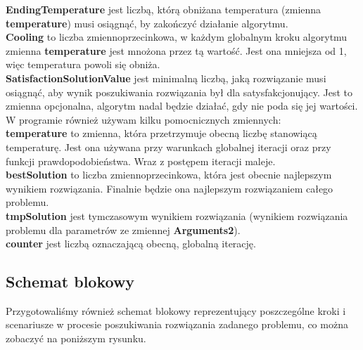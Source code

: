 \documentclass[twoside]{projektInzynierskiMS1}
\newcommand{\si}{ś}
\begin{document}
\textbf{EndingTemperature} jest liczbą, którą obniżana temperatura (zmienna \textbf{temperature}) musi osiągnąć, by zakończyć działanie algorytmu. \\

\textbf{Cooling} to liczba zmiennoprzecinkowa, w każdym globalnym kroku algorytmu zmienna \textbf{temperature} jest mnożona przez tą warto\si ć. Jest ona mniejsza od 1, więc temperatura powoli się obniża. \\

\textbf{SatisfactionSolutionValue} jest minimalną liczbą, jaką rozwiązanie musi osiągnąć, aby wynik poszukiwania rozwiązania był dla satysfakcjonujący. Jest to zmienna opcjonalna, algorytm nadal będzie działać, gdy nie poda się jej warto\si ci.\\

W programie również używam kilku pomocnicznych zmiennych: \\

\textbf{temperature} to zmienna, która przetrzymuje obecną liczbę stanowiącą temperaturę. Jest ona używana przy warunkach globalnej iteracji oraz przy funkcji prawdopodobieństwa. Wraz z postępem iteracji maleje. \\

\textbf{bestSolution} to liczba zmiennoprzecinkowa, która jest obecnie najlepszym wynikiem rozwiązania. Finalnie będzie ona najlepszym rozwiązaniem całego problemu. \\

\textbf{tmpSolution} jest tymczasowym wynikiem rozwiązania (wynikiem rozwiązania problemu dla parametrów ze zmiennej \textbf{Arguments2}). \\

\textbf{counter} jest liczbą oznaczającą obecną, globalną iterację. \\

\subsection{Schemat blokowy}
Przygotowali\si my również schemat blokowy reprezentujący poszczególne kroki i scenariusze w procesie poszukiwania rozwiązania zadanego problemu, co można zobaczyć na poniższym rysunku.
\end{document}
